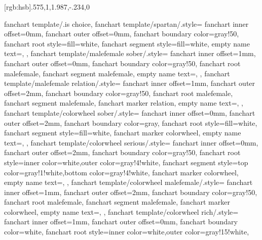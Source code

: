\ExplSyntaxOff



[rgb:hsb]{.575,1,1}{.987,-.234,0}



\gtrset
  {
    fanchart template/.is choice,
%
    fanchart template/spartan/.style=
      {
        fanchart inner offset={0mm},
        fanchart outer offset={0mm},
        fanchart boundary color=gray!50,
        fanchart root style={fill=white},
        fanchart segment style={fill=white},
        empty name text={},
      },
    fanchart template/malefemale sober/.style=
      {
        fanchart inner offset={1mm},
        fanchart outer offset={0mm},
        fanchart boundary color=gray!50,
        fanchart root malefemale,
        fanchart segment malefemale,
        empty name text={},
      },
    fanchart template/malefemale relation/.style=
      {
        fanchart inner offset={1mm},
        fanchart outer offset={2mm},
        fanchart boundary color=gray!50,
        fanchart root malefemale,
        fanchart segment malefemale,
        fanchart marker relation,
        empty name text={},
      },
    fanchart template/colorwheel sober/.style=
      {
        fanchart inner offset={0mm},
        fanchart outer offset={2mm},
        fanchart boundary color=gray,
        fanchart root style={fill=white},
        fanchart segment style={fill=white},
        fanchart marker colorwheel,
        empty name text={},
      },
    fanchart template/colorwheel serious/.style=
      {
        fanchart inner offset={0mm},
        fanchart outer offset={2mm},
        fanchart boundary color=gray!50,
        fanchart root style={inner color=white,outer color=gray!4!white},
        fanchart segment style={top color=gray!1!white,bottom color=gray!4!white},
        fanchart marker colorwheel,
        empty name text={},
      },
    fanchart template/colorwheel malefemale/.style=
      {
        fanchart inner offset={1mm},
        fanchart outer offset={2mm},
        fanchart boundary color=gray!50,
        fanchart root malefemale,
        fanchart segment malefemale,
        fanchart marker colorwheel,
        empty name text={},
      },
    fanchart template/colorwheel rich/.style=
      {
        fanchart inner offset={1mm},
        fanchart outer offset={0mm},
        fanchart boundary color=white,
        fanchart root style={inner color=white,outer color=gray!15!white},
}}
